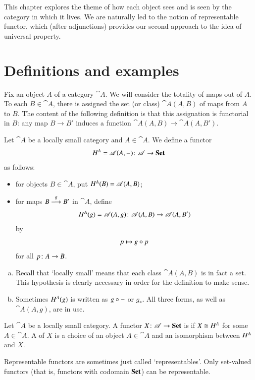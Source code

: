 This chapter explores the theme of how each object sees and is seen by the
category in which it lives.  We are naturally led to the notion of
representable functor, which (after adjunctions) provides our second
approach to the idea of universal property.



\section{Definitions and examples}
\label{sec:rep-defns}


Fix an object $A$ of a category $\cat{A}$.  We will consider the totality
of maps out of $A$.  To each $B \in \cat{A}$, there is assigned the set
(or class) $\cat{A}(A, B)$ of maps from $A$ to $B$.  The content of the
following definition is that this assignation is functorial in $B$: any map
$B \to B'$ induces a function $\cat{A}(A, B) \to \cat{A}(A, B')$.

\begin{defn}
\label{defn:co-rep}
Let $\cat{A}$ be a locally small category and $A \in \cat{A}$.  We define a
functor
\[
\h^A = \cat{A}(A, \dashbk)\from \cat{A} \to \Set%
%
\ntn{hom-out}
%
\]
as follows:
%
\begin{itemize}
\item
for objects $B \in \cat{A}$, put $H^A(B) = \mathscr{A}(A, B)$;

\item
for maps $B \stackrel{g}{\longrightarrow} B'$ in $\cat{A}$, define
\[
\h^A(g) = \cat{A}(A, g)\from
\cat{A}(A, B) \to \cat{A}(A, B')
\]
by
\[
p
\mapsto
g \mathbin{\circ} p
\]
for all $p\from A \to B$.
\end{itemize}
\end{defn}

\begin{remarks}
\begin{enumerate}[(b)]
\item
Recall that `locally%
%
%
%
small' means that each class $\cat{A}(A, B)$ is in fact a set.  This
hypothesis is clearly necessary in order for the definition to make sense.

\item
Sometimes $H^A(g)$ is written as $g \mathbin{\circ} -$%
%
%
 or $g_*$.%
%
%
All three forms, as well as $\cat{A}(A, g)$, are in use.
\end{enumerate}
\end{remarks}

\begin{defn}
Let $\cat{A}$ be a locally small category.  A functor $X\from \cat{A} \to
\Set$ is %
%
%
if $X \cong H^A$ for some $A \in \cat{A}$.
A %
%
%
of $X$ is a choice of an object $A \in \cat{A}$ and an isomorphism between
$H^A$ and $X$.
\end{defn}
%
Representable functors are sometimes just called `representables'.  Only
set-valued%
%
%
%
functors (that is, functors with codomain $\mathbf{Set}$) can be representable.

